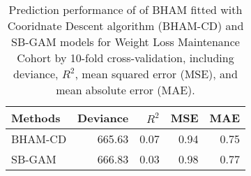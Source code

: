 \documentclass[AMA,STIX1COL,]{WileyNJD-v2}
\begin{document}
\newpage

\begin{table}[ht]
\centering
\begin{tabular}{lrrrr}
  \hline
Methods & Deviance & $R^2$ & MSE & MAE \\ 
  \hline
BHAM-CD & 665.63 & 0.07 & 0.94 & 0.75 \\ 
  SB-GAM & 666.83 & 0.03 & 0.98 & 0.77 \\ 
   \hline
\end{tabular}
\caption{Prediction performance of of BHAM fitted with Cooridnate Descent algorithm (BHAM-CD)  and SB-GAM models for Weight Loss Maintenance Cohort by 10-fold cross-validation, including deviance, $R^2$,  mean squared error (MSE), and mean absolute error (MAE).} 
\label{tab:WLM_res}
\end{table}
\end{document}
